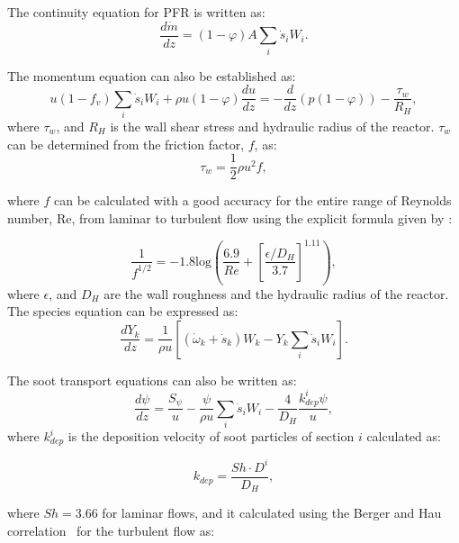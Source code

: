The continuity equation for PFR is written as:
\begin{equation}
	\frac{d\dot{m}}{dz} =(1-\varphi)A \sum_i \dot s_i W_i
	\label{eqn:contpfr}.
\end{equation}

The momentum equation can also be established as:
\begin{equation}
	u (1-f_v) \sum_i \dot s_i W_i + \rho u (1-\varphi) \frac{du}{dz}
	=-\frac{d}{dz}(p(1-\varphi))-\frac{\tau_{w}}{R_H} 
	\label{eqn:momenpfr},
\end{equation}
 \noindent where $\tau_w$, and $R_H$ is the wall shear stress and hydraulic radius of the reactor. $\tau_w$ can be determined from the friction factor, $f$, as:
\begin{equation}
	\tau_w = \frac{1}{2}\rho u^2 f, 
	\label{eqn:wallshearpfr}
\end{equation}

\noindent where $f$ can be calculated with a good accuracy for the entire range of Reynolds number, Re, from laminar to turbulent flow using the explicit formula given by \citet{haaland1983simple}:

\begin{equation}
	\frac{1}{f^{1/2}} = -1.8 \mathrm{log}
	\left(
		\frac{6.9}{Re}+
		\left[ \frac{\epsilon/D_H}{3.7} \right]^{1.11}
	\right)
	\label{eqn:fpfr},
\end{equation}
\noindent where $\epsilon$, and ${D_H}$ are the wall roughness and the hydraulic radius of the reactor. The species equation can be expressed as:
\begin{equation}
	\frac{d Y_k}{d z}=\frac{1}{\rho u}\left[\left(\dot{\omega}_k+\dot{s}_k\right) W_k-Y_k \sum_i \dot{s}_i W_i\right]
	\label{eqn:speciespfr}.
\end{equation}

 The soot transport equations can also be written as:
\begin{equation}
	\frac{d \psi}{d z}=
	\frac{S_{\psi}}{u}
	-\frac{\psi}{\rho u}\sum_i \dot{s}_i W_i
	-\frac{4}{D_H}\frac{k^i_{dep}\psi}{u},
	\label{eqn:sootpfr}
\end{equation}
\noindent where $k^i_{dep}$ is the deposition velocity of soot particles of section $i$ calculated as:

\begin{equation}
	k_{dep}=
	\frac{Sh\cdot D^i}{D_H},
	\label{eqn:kdep}
\end{equation}

\noindent where $Sh=$3.66 for laminar flows, and it calculated using the Berger and Hau correlation~\citep{berger1977mass} for the turbulent flow as:

